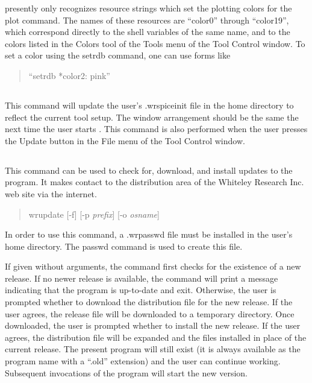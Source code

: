{\WRspice} presently only recognizes resource strings which set the
plotting colors for the {\cb plot} command.  The names of these
resources are ``{\vt color0}'' through ``{\vt color19}'', which
correspond directly to the shell variables of the same name, and to
the colors listed in the {\cb Colors} tool of the {\cb Tools} menu of
the {\cb Tool Control} window.  To set a color using the {\cb setrdb}
command, one can use forms like
\begin{quote}
``{\vt setrdb *color2:  pink}''
\end{quote}

\subsection{}


This command will update the user's {\vt .wrspiceinit} file in the
home directory to reflect the current tool setup.  The window
arrangement should be the same the next time the user starts
{\WRspice}.  This command is also performed when the user presses the
{\cb Update} button in the {\cb File} menu of the {\cb Tool Control}
window.

\subsection{}


This command can be used to check for, download, and install updates
to the program.  It makes contact to the distribution area of the
Whiteley Research Inc.  web site via the internet.
\begin{quote}
{\vt wrupdate} [{\vt -f}] [{\vt -p} {\it prefix\/}] [{\vt -o} {\it osname\/}]
\end{quote}

In order to use this command, a {\vt .wrpasswd} file must be installed
in the user's home directory.  The {\cb passwd} command is used to
create this file.

If given without arguments, the command first checks for the existence
of a new release.  If no newer release is available, the command will
print a message indicating that the program is up-to-date and exit. 
Otherwise, the user is prompted whether to download the distribution
file for the new release.  If the user agrees, the release file will
be downloaded to a temporary directory.  Once downloaded, the user is
prompted whether to install the new release.  If the user agrees, the
distribution file will be expanded and the files installed in place of
the current release.  The present program will still exist (it is
always available as the program name with a ``{\vt .old}'' extension)
and the user can continue working.  Subsequent invocations of the
program will start the new version.

